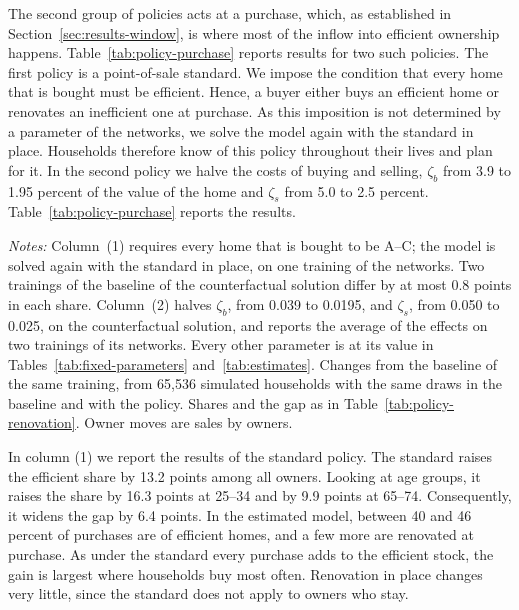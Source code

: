 The second group of policies acts at a purchase, which, as established in  Section~\ref{sec:results-window}, is where most of the inflow
into efficient ownership happens.
Table~\ref{tab:policy-purchase} reports results for two such policies. The first policy is a
point-of-sale standard. We impose the condition that every home that is bought must be efficient. Hence, a
buyer either buys an efficient home or renovates an inefficient one at
purchase. As this imposition is not determined by a parameter of the networks,  we solve the
model again with the standard in place. Households therefore know of this policy
throughout their lives and plan for it. In the second policy we halve the costs
of buying and selling, $\zeta_b$ from 3.9 to 1.95 percent of the value of
the home and $\zeta_s$ from 5.0 to 2.5 percent. Table~\ref{tab:policy-purchase} reports the results.

\begin{table}[t]
  \centering
  \caption[Acting at a purchase]{{Acting at a
  purchase}}\label{tab:policy-purchase}
  \begin{threeparttable}
    \small
    \begin{tablenotes}[flushleft]\footnotesize
      \item {\textit{Notes:} Column~(1) requires every home that is
      bought to be A--C; the model is solved again with the standard in
      place, on one training of the networks. Two trainings of the baseline
      of the counterfactual solution differ by at most 0.8 points in each
      share. Column~(2) halves $\zeta_b$, from 0.039 to 0.0195, and
      $\zeta_s$, from 0.050 to 0.025, on the counterfactual solution, and
      reports the average of the effects on two trainings of its networks.
      Every other parameter is at its value in
      Tables~\ref{tab:fixed-parameters} and~\ref{tab:estimates}. Changes
      from the baseline of the same training, from 65,536 simulated
      households with the same draws in the baseline and with the policy.
      Shares and the gap as in Table~\ref{tab:policy-renovation}. Owner
      moves are sales by owners.}
    \end{tablenotes}
  \end{threeparttable}
\end{table}

In column (1) we report the results of the standard policy. The standard raises the efficient share by 13.2 points among all owners. Looking at age groups, it raises the share by
16.3 points at 25--34 and by 9.9 points at 65--74. Consequently, it widens the gap by 6.4
points. In the estimated
model, between 40 and 46 percent of purchases are of efficient homes, and a
few more are renovated at purchase.
As under the standard every purchase adds to the efficient stock, the gain
is largest where households buy most often.  Renovation in place changes very little, since the standard does not
apply to owners who stay. 

